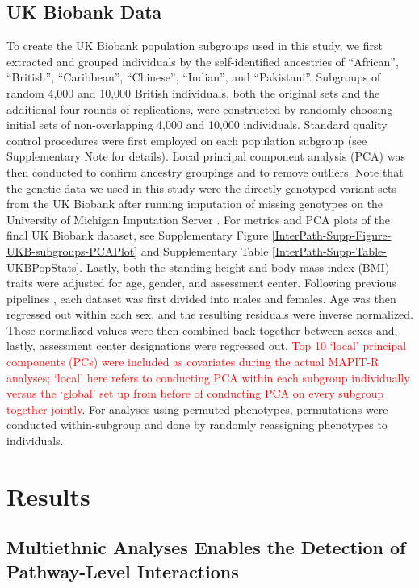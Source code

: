 \documentclass[10pt,a4paper]{article}
\begin{document}
\subsection*{UK Biobank Data} 

To create the UK Biobank population subgroups used in this study, we first extracted and grouped individuals by the self-identified ancestries of ``African'', ``British'', ``Caribbean'', ``Chinese'', ``Indian'', and ``Pakistani''. Subgroups of random 4,000 and 10,000 British individuals, both the original sets and the additional four rounds of replications, were constructed by randomly choosing initial sets of non-overlapping 4,000 and 10,000 individuals. Standard quality control procedures were first employed on each population subgroup (see Supplementary Note for details). Local principal component analysis (PCA) was then conducted to confirm ancestry groupings and to remove outliers. Note that the genetic data we used in this study were the directly genotyped variant sets from the UK Biobank after running imputation of missing genotypes on the University of Michigan Imputation Server \cite{Das2016}. For metrics and PCA plots of the final UK Biobank dataset, see Supplementary Figure \ref{InterPath-Supp-Figure-UKB-subgroups-PCAPlot} and Supplementary Table \ref{InterPath-Supp-Table-UKBPopStats}. Lastly, both the standing height and body mass index (BMI) traits were adjusted for age, gender, and assessment center. Following previous pipelines \cite{Wood2014,Locke2015}, each dataset was first divided into males and females. Age was then regressed out within each sex, and the resulting residuals were inverse normalized. These normalized values were then combined back together between sexes and, lastly, assessment center designations were regressed out. \textcolor{red}{Top 10 `local' principal components (PCs) were included as covariates during the actual MAPIT-R analyses; `local' here refers to conducting PCA within each subgroup individually versus the `global' set up from before of conducting PCA on every subgroup together jointly}. For analyses using permuted phenotypes, permutations were conducted within-subgroup and done by randomly reassigning phenotypes to individuals.




\section*{Results}\label{InterPath-Results}


\subsection*{Multiethnic Analyses Enables the Detection of Pathway-Level Interactions}\label{InterPath-Results-PathwayEpistasis}
\end{document}
